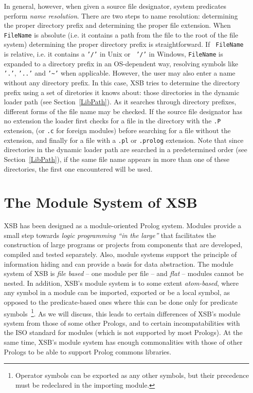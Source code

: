 In general, however, when given a source file designator, system
predicates perform {\em name resolution}.  There are two steps to name
resolution: determining the proper directory prefix and determining
the proper file extension.  When {\tt FileName} is absolute (i.e. it
contains a path from the file to the root of the file system)
determining the proper directory prefix is straightforward.  If {\tt
  FileName} is relative, i.e. it contains a {\tt '/'} in Unix or {\tt
  '/'} in Windows, {\tt FileName} is expanded to a directory prefix in
an OS-dependent way, resolving symbols like {\tt '.'}, {\tt '..'} and
{\tt '\~{}'} when applicable.  However, the user may also enter a name
without any directory prefix. In this case, XSB tries to determine the
directory prefix using a set of diretories it knows about: those
directories in the dynamic loader path (see Section~\ref{LibPath}).
As it searches through directory prefixes, different forms of the file
name may be checked.  If the source file designator has no extension
the loader first checks for a file in the directory with the {\tt .P}
extension, (or {\tt .c} for foreign modules) before searching for a
file without the extension, and finally for a file with a {\tt .pl} or {\tt .prolog}
extension.  Note that since directories in the dynamic loader path are
searched in a predetermined order (see Section~\ref{LibPath}), if the
same file name appears in more than one of these directories, the
first one encountered will be used.

\section{The Module System of XSB} \label{Modules}
XSB has been designed as a module-oriented Prolog system.  Modules
provide a small step towards {\em logic programming ``in the large''}
that facilitates the construction of large programs or projects from
components that are developed, compiled and tested separately.  Also,
module systems support the principle of information hiding and can
provide a basis for data abstraction.  The module system of XSB is
{\em file based} -- one module per file -- and {\em flat} -- modules
cannot be nested.  In addition, XSB's module system is to some extent
{\em atom-based}, where any symbol in a module can be imported,
exported or be a local symbol, as opposed to the predicate-based ones
where this can be done only for predicate symbols~\footnote{Operator
  symbols can be exported as any other symbols, but their precedence
  must be redeclared in the importing module.}.  As we will discuss,
this leads to certain differences of XSB's module system from those of
some other Prologs, and to certain incompatabilities with the ISO
standard for modules (which is not supported by most Prologs).  At the
same time, XSB's module system has enough commonalities with those of
other Prologs to be able to support Prolog commons libraries.

